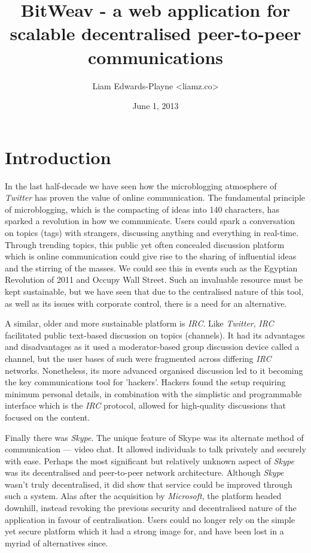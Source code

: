 \documentclass[10pt,a4paper,onecolumn]{article}
\author{Liam Edwards-Playne \textless liamz.co\textgreater}
\date{June 1, 2013}
\title{BitWeav - a web application for scalable decentralised peer-to-peer  communications}
\begin{document}
\maketitle
\begin{abstract}
\end{abstract}

\section{Introduction}
In the last half-decade we have seen how the microblogging atmosphere of \emph{Twitter} has proven the value of online communication. The fundamental principle of microblogging, which is the compacting of ideas into 140 characters, has sparked a revolution in how we communicate. Users could spark a conversation on topics (tags) with strangers, discussing anything and everything in real-time. Through trending topics, this public yet often concealed discussion platform which is online communication could give rise to the sharing of influential ideas and the stirring of the masses. We could see this in events such as the Egyptian Revolution of 2011 and Occupy Wall Street. Such an invaluable resource must be kept sustainable, but we have seen that due to the centralised nature of this tool, as well as its issues with corporate control, there is a need for an alternative. 

A similar, older and more sustainable platform is \emph{IRC}. Like \emph{Twitter}, \emph{IRC} facilitated public text-based discussion on topics (channels). It had its advantages and disadvantages as it used a moderator-based group discussion device called a channel, but the user bases of such were fragmented across differing \emph{IRC} networks. Nonetheless, its more advanced organised discussion led to it becoming the key communications tool for 'hackers'. Hackers found the setup requiring minimum personal details, in combination with the simplistic and programmable interface which is the \emph{IRC} protocol, allowed for high-quality discussions that focused on the content. 

Finally there was \emph{Skype}. The unique feature of Skype was its alternate method of communication — video chat. It allowed individuals to talk privately and securely with ease. Perhaps the most significant but relatively unknown aspect of \emph{Skype} was its decentralised and peer-to-peer network architecture. Although \emph{Skype} wasn't truly decentralised, it did show that service could be improved through such a system. Alas after the acquisition by \textit{Microsoft}, the platform headed downhill, instead revoking the previous security and decentralised nature of the application in favour of centralisation. Users could no longer rely on the simple yet secure platform which it had a strong image for, and have been lost in a myriad of alternatives since. 
\end{document}
